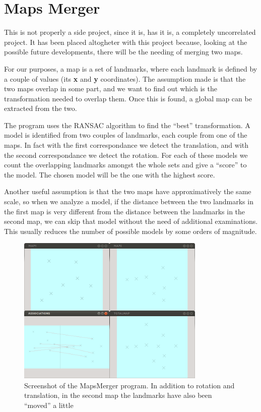 \section{Maps Merger}
This is not properly a side project, since it is, has it is, a completely uncorrelated project.
It has been placed altogheter with this project because, looking at the possible future developments, there will be the needing of merging two maps.

For our purposes, a map is a set of landmarks, where each landmark is defined by a couple of values (its \textbf{x} and \textbf{y} coordinates).
The assumption made is that the two maps overlap in some part, and we want to find out which is the transformation needed to overlap them. Once this is found, a global map can be extracted from the two.

The program uses the RANSAC algorithm to find the ``best'' transformation.
A model is identified from two couples of landmarks, each couple from one of the maps. In fact with the first correspondance we detect the translation, and with the second correspondance we detect the rotation.
For each of these models we count the overlapping landmarks amongst the whole sets and give a ``score'' to the model. The chosen model will be the one with the highest score.

Another useful assumption is that the two maps have approximatively the same scale, so when we analyze a model, if the distance between the two landmarks in the first map is very different from the distance between the landmarks in the second map, we can skip that model without the need of additional examinations. This usually reduces the number of possible models by some orders of magnitude.

\begin{figure}[htbp]
  \centering
    \includegraphics[width=0.8\textwidth]{images/mapsmerger.png}
  \caption{Screenshot of the MapsMerger program. In addition to rotation and translation, in the second map the landmarks have also been ``moved'' a little}
  \label{fig:mapsmerger}
\end{figure}
